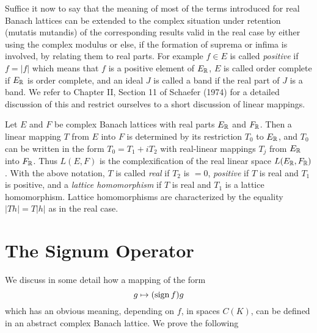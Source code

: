 Suffice it now to say that the meaning of most of the terms introduced for real Banach lattices can be extended to the complex situation under retention (mutatis mutandis) of the corresponding results valid in the real case by either using the complex modulus or else, if the formation of suprema or infima is involved, by relating them to real parts.
For example $ f \in E $ is called \emph{positive} if $ f = |f| $ which means that $ f $ is a positive element of $ E_{\mathbb{R}} $, $ E $ is called order complete if $ E_{\mathbb{R}} $ is order complete, and an ideal $ J $ is called a band if the real part of $ J $ is a band.
We refer to Chapter II, Section 11 of Schaefer (1974) for a detailed discussion of this and restrict ourselves to a short discussion of linear mappings.

Let $ E $ and $ F $ be complex Banach lattices with real parts $ E_{\mathbb{R}} $ and $ F_{\mathbb{R}} $.
Then a linear mapping $ T $ from $ E $ into $ F $ is determined by its restriction $ T_{0} $ to $ E_{\mathbb{R}} $, and $ T_{0} $ can be written in the form $ T_{0} = T_{1} + iT_{2} $ with real-linear mappings $ T_{j} $ from $ E_{\mathbb{R}} $ into $ F_{\mathbb{R}} $.
Thus $ L(E,F) $ is the complexification of the real linear space $ L(E_{\mathbb{R}},F_{\mathbb{R}}) $.
With the above notation, $ T $ is called \emph{real} if $ T_{2} $ is $ = 0 $, \emph{positive} if $ T $ is real and $ T_{1} $ is positive, and a \emph{lattice homomorphism} if $ T $ is real and $ T_{1} $ is a lattice homomorphism.
Lattice homomorphisms are characterized by the equality $ |Th| = T|h| $ as in the real case.
\section{The Signum Operator}\label{sec:c1-8}
We discuss in some detail how a mapping of the form
\[
g \mapsto (\operatorname{sign} f )g
\]
which has an obvious meaning, depending on $ f $, in spaces $ C(K) $, can be defined in an abstract complex Banach lattice.
We prove the following

